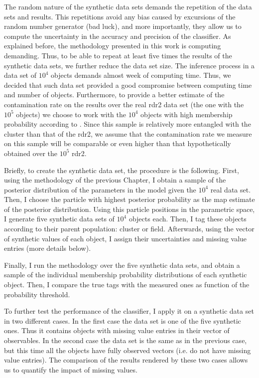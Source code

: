 The random nature of the synthetic data sets demands the repetition of the data sets and results. This repetitions avoid any bias caused by excursions of the random number generator (bad luck), and more importantly, they allow us to compute the uncertainty in the accuracy and precision of the classifier. As explained before, the methodology presented in this work is computing demanding. Thus, to be able to repeat at least five times the results of the synthetic data sets, we further reduce the data set size. The inference process in a data set of $10^4$ objects demands almost week of computing time. Thus, we decided that such data set provided a good compromise between computing time and number of objects. Furthermore, to provide a better estimate of the contamination rate on the results over the real \gls{rdr2} data set (the one with the $10^5$ objects) we choose to work with the $10^4$ objects with high membership probability according to \citet{Bouy2015}. Since this sample is relatively more entangled with the cluster than that of the \gls{rdr2}, we assume that the contamination rate we measure on this sample will be comparable or even higher than that hypothetically obtained over the $10^5$ \gls{rdr2}. 

Briefly, to create the synthetic data set, the procedure is the following. First, using the methodology of the previous Chapter, I obtain a sample of the posterior distribution of the parameters in the model given the $10^4$ real data set. Then, I choose the particle with highest posterior probability as the \gls{map} estimate of the posterior distribution. Using this particle positions in the parametric space, I generate five synthetic data sets of $10^4$ objects each. Then, I tag these objects according to their parent population: cluster or field. Afterwards, using the vector of synthetic values of each object, I assign their uncertainties and missing value entries (more details  below).

Finally, I run the methodology over the five synthetic data sets, and obtain a sample of the individual membership probability distributions of each synthetic object. Then, I compare the true tags with the measured ones as function of the probability threshold. 

To further test the performance of the classifier, I apply it on a synthetic data set in two different cases. In the first case the data set is one of the five synthetic ones. Thus it contains objects with missing value entries in their vector of observables.  In the second case the data set is the same as in the previous case, but this time all the objects have fully observed vectors (i.e. do not have missing value entries). The comparison of the results rendered by these two cases allows us to quantify the impact of missing values. 

